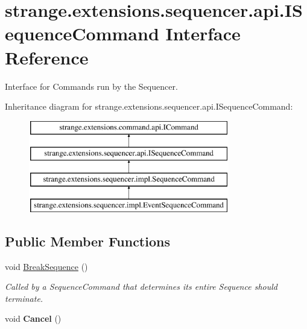 \hypertarget{interfacestrange_1_1extensions_1_1sequencer_1_1api_1_1_i_sequence_command}{\section{strange.\-extensions.\-sequencer.\-api.\-I\-Sequence\-Command Interface Reference}
\label{interfacestrange_1_1extensions_1_1sequencer_1_1api_1_1_i_sequence_command}
}


Interface for Commands run by the Sequencer.  


Inheritance diagram for strange.\-extensions.\-sequencer.\-api.\-I\-Sequence\-Command\-:\begin{figure}[H]
\begin{center}
\leavevmode
\includegraphics[height=4.000000cm]{interfacestrange_1_1extensions_1_1sequencer_1_1api_1_1_i_sequence_command}
\end{center}
\end{figure}
\subsection*{Public Member Functions}
\begin{DoxyCompactItemize}
\item 
\hypertarget{interfacestrange_1_1extensions_1_1sequencer_1_1api_1_1_i_sequence_command_a4da87b9b59433b57f8c15007040367cb}{void \hyperlink{interfacestrange_1_1extensions_1_1sequencer_1_1api_1_1_i_sequence_command_a4da87b9b59433b57f8c15007040367cb}{Break\-Sequence} ()}\label{interfacestrange_1_1extensions_1_1sequencer_1_1api_1_1_i_sequence_command_a4da87b9b59433b57f8c15007040367cb}

\begin{DoxyCompactList}\small\item\em Called by a Sequence\-Command that determines its entire Sequence should terminate. \end{DoxyCompactList}\item 
\hypertarget{interfacestrange_1_1extensions_1_1sequencer_1_1api_1_1_i_sequence_command_a740670267c357c3b13d2370f820543c3}{void {\bfseries Cancel} ()}\label{interfacestrange_1_1extensions_1_1sequencer_1_1api_1_1_i_sequence_command_a740670267c357c3b13d2370f820543c3}

\end{DoxyCompactItemize}
